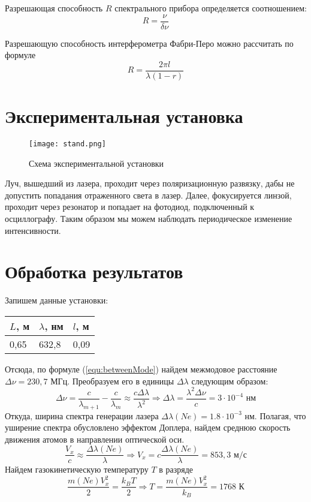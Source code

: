 Разрешающая способность $R$ спектрального прибора определяется соотношением:
\begin{equation*}
	R = \frac{\nu}{\delta\nu}
\end{equation*}

Разрешающую способность интерферометра Фабри-Перо можно рассчитать по формуле
\begin{equation}
\label{equ:prob}
	R = \frac{2\pi l}{\lambda (1-r)}
\end{equation}

\section{Экспериментальная установка}

\begin{figure}[H]
	\centering
	\texttt{[image: stand.png]}
	\caption{Схема экспериментальной установки}
\end{figure}

Луч, вышедший из лазера, проходит через поляризационную развязку, дабы не допустить попадания отраженного света в лазер. Далее, фокусируется линзой, проходит через резонатор и попадает на фотодиод, подключенный к осциллографу. Таким образом мы можем наблюдать периодическое изменение интенсивности.

\section{Обработка результатов}

Запишем данные установки:
\begin{table}[H]
	\centering
	\begin{tabular}{|l|l|l|}
		\hline
		$L$, м & $\lambda$, нм & $l$, м \\ \hline
		0,65   & 632,8         & 0,09   \\ \hline
	\end{tabular}
\end{table}
Отсюда, по формуле (\ref{equ:betweenMode}) найдем межмодовое расстояние $\Delta\nu = 230,7$ МГц.
Преобразуем его в единицы $\Delta\lambda$ следующим образом:
\begin{equation*}
	\Delta\nu = \frac{c}{\lambda_{m+1}} - \frac{c}{\lambda_{m}} \approx \frac{c\Delta\lambda}{\lambda^2} \Rightarrow \Delta\lambda = \frac{\lambda^2\Delta\nu}{c} = 3\cdot 10^{-4} \text{ нм}
\end{equation*}
Откуда, ширина спектра генерации лазера $\Delta\lambda(Ne) = 1.8\cdot10^{-3}$ нм.
Полагая, что уширение спектра обусловлено эффектом Доплера, найдем среднюю скорость движения атомов в направлении оптической оси.
\begin{equation*}
	\frac{V_x}{c} \approx \frac{\Delta\lambda(Ne)}{\lambda} \Rightarrow V_x = c\frac{\Delta\lambda(Ne)}{\lambda} = 853,3 \text{ м/с}
\end{equation*}
Найдем газокинетическую температуру $T$ в разряде
\begin{equation*}
	\frac{m(Ne)V_x^2}{2} = \frac{k_BT}{2} \Rightarrow T = \frac{m(Ne)V_x^2}{k_B} = 1768 \text{ К}
\end{equation*}

